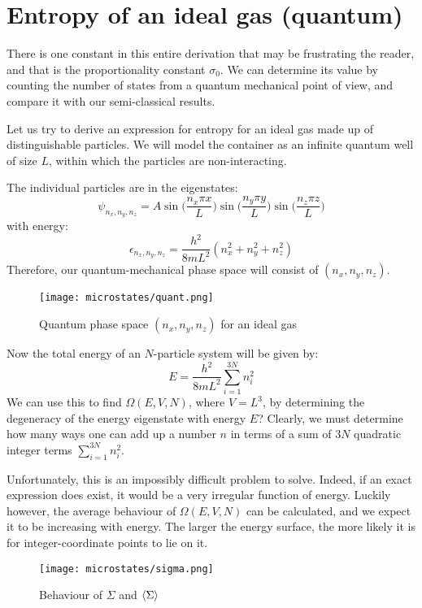 \documentclass[a4paper,11pt,oneside]{book}
\begin{document}
\section{Entropy of an ideal gas (quantum)}
There is one constant in this entire derivation that may be frustrating the reader, and that is the proportionality constant $\sigma_0$. We can determine its value by counting the number of states from a quantum mechanical point of view, and compare it with our semi-classical results. 


Let us try to derive an expression for entropy for an ideal gas made up of distinguishable particles. We will model the container as an infinite quantum well of size $L$, within which the particles are non-interacting. 

The individual particles are in the eigenstates:
\begin{equation}
    \psi_{n_x,n_y,n_z} = A \sin \bigg(\frac{n_x\pi x}{L}\bigg)\sin \bigg(\frac{n_y\pi y}{L}\bigg)\sin \bigg(\frac{n_z\pi z}{L}\bigg)
\end{equation}
with energy:
\begin{equation}
    \epsilon_{n_x,n_y,n_z} = \frac{h^2}{8mL^2}(n_x^2+n_y^2+n_z^2)
\end{equation}
Therefore, our quantum-mechanical phase space will consist of $(n_x,n_y,n_z)$. 
\begin{figure}[h!]
    \centering
    \texttt{[image: microstates/quant.png]}
    \caption{Quantum phase space $(n_x,n_y,n_z)$ for an ideal gas}
    \label{fig:my_label}
\end{figure}
Now the total energy of an $N$-particle system will be given by:
\begin{equation}
    E=\frac{h^2}{8mL^2}\sum_{i=1}^{3N} n_i^2
\end{equation}
We can use this to find $\Omega(E,V,N)$, where $V=L^3$, by determining the degeneracy of the energy eigenstate with energy $E$? Clearly, we must determine how many ways one can add up a number $n$ in terms of a sum of $3N$ quadratic integer terms $\sum \limits_{i=1}^{3N} n_i^2$. 

Unfortunately, this is an impossibly difficult problem to solve. Indeed, if an exact expression does exist, it would be a very irregular function of energy. Luckily however, the average behaviour of $\Omega(E,V,N)$ can be calculated, and we expect it to be increasing with energy. The larger the energy surface, the more likely it is for integer-coordinate points to lie on it. 

\begin{figure}[h!]
    \centering
    \texttt{[image: microstates/sigma.png]}
    \caption{Behaviour of $\Sigma$ and $\braket{\Sigma}$}
    \label{fig:my_label}
\end{figure}
\end{document}
